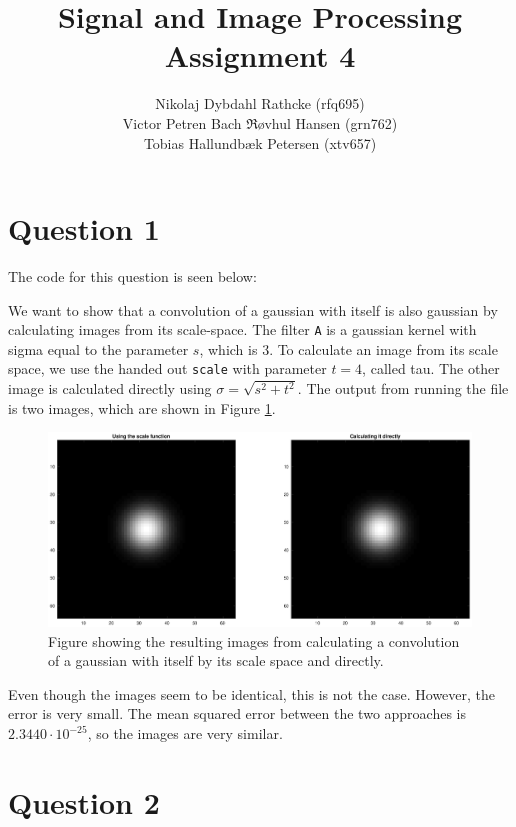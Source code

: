 \documentclass[a4paper]{article}
\author{Nikolaj Dybdahl Rathcke (rfq695) \\
        Victor Petren Bach $\Re$øvhul Hansen (grn762) \\
        Tobias Hallundbæk Petersen (xtv657) }
\title{Signal and Image Processing \\ Assignment 4}
\begin{document}
\maketitle
\section{Question 1}
The code for this question is seen below:

We want to show that a convolution of a gaussian with itself is also gaussian by calculating images from its scale-space. The filter \texttt{A} is a gaussian kernel with sigma equal to the parameter $s$, which is $3$. To calculate an image from its scale space, we use the handed out \texttt{scale} with parameter $t=4$, called tau. The other image is calculated directly using $\sigma=\sqrt{s^2+t^2}$. The output from running the file is two images, which are shown in Figure \ref{q1_1}.
\begin{figure}[H]
  \centering
  \captionsetup{justification=centering}
\includegraphics[width=\textwidth]{q1_1.eps}
  \caption{Figure showing the resulting images from calculating a convolution of a gaussian with itself by its scale space and directly.}
  \label{q1_1}
\end{figure}
Even though the images seem to be identical, this is not the case. However, the error is very small. The mean squared error between the two approaches is $2.3440\cdot10^{-25}$, so the images are very similar.

\section{Question 2}
\end{document}
